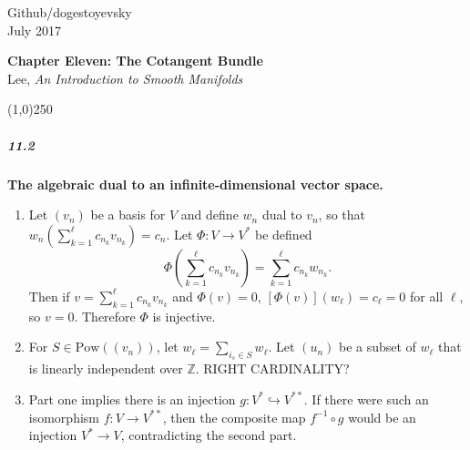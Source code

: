 \documentclass[10pt,letter]{article}
\begin{document}
\noindent Github/dogestoyevsky \\
July 2017
\begin{center}
\textbf{Chapter Eleven: The Cotangent Bundle}\\ Lee, \textit{An Introduction to Smooth Manifolds}

\line(1,0){250}
\end{center}

\subparagraph*{11.2} {\bf The algebraic dual to an infinite-dimensional vector space.} 
\begin{enumerate}
\item Let $(v_n)$ be a basis for $V$ and define $w_n$ dual to $v_n$, so that $w_n(\sum_{k=1}^\ell c_{n_k} v_{n_k}) = c_n$. Let $\Phi: V \rightarrow V^{\ast}$ be defined \[ \Phi(\sum_{k=1}^\ell c_{n_k} v_{n_k}) = \sum_{k=1}^\ell c_{n_k} w_{n_k}. \] Then if $v = \sum_{k=1}^\ell c_{n_k} v_{n_k}$ and $\Phi(v) = 0$, $[\Phi(v)](w_{\ell}) = c_{\ell} = 0$ for all $\ell$, so $v = 0$. Therefore $\Phi$ is injective. 
\item For $S \in \text{Pow}((v_n))$, let $w_\ell = \sum_{i_s \in S} w_{\ell}$. Let $(u_n)$ be a subset of $w_\ell$ that is linearly independent over $\mathbb{Z}$. RIGHT CARDINALITY? 
\item Part one implies there is an injection $g: V^{\ast} \hookrightarrow V^{\ast \ast}$. If there were such an isomorphism $f: V \rightarrow V^{\ast \ast}$, then the composite map $f^{-1} \circ g$ would be an injection $V^{\ast} \rightarrow V$, contradicting the second part. 
\end{enumerate}
\end{document}
